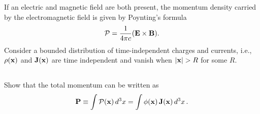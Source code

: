 \documentclass[11pt]{article}
\newcommand{\beq}{\begin{equation*}}
\newcommand{\eeq}{\end{equation*}}
\newenvironment{statement}[1]
{
	\section{#1}
	\color{darkgray}
	\ignorespaces
}
{
}
\newenvironment{problem}
{
	\subsection{}
	\color{darkgray}
    \ignorespaces
}
{

}
\begin{document}
\newcommand{\alp}{\alpha}
\newcommand{\tht}{\theta}
\newcommand{\vph}{\varphi}
\newcommand{\omg}{\omega}

\newcommand{\vA}{\vb{A}}
\newcommand{\vB}{\vb{B}}
\newcommand{\vE}{\vb{E}}
\newcommand{\vJ}{\vb{J}}
\newcommand{\vP}{\vb{P}}
\newcommand{\vv}{\vb{v}}
\newcommand{\vx}{\vb{x}}
\newcommand{\vomg}{\boldsymbol{\omg}}
\newcommand{\rh}{\vb{\hat{r}}}
\newcommand{\phh}{\boldsymbol{\hat{\vph}}}
\newcommand{\thh}{\boldsymbol{\hat{\tht}}}

\newcommand{\vAx}{\vA(\vx)}
\newcommand{\vBx}{\vB(\vx)}
\newcommand{\vJx}{\vJ(\vx)}
\newcommand{\vvx}{\vv(\vx)}

\newcommand{\rhox}{\rho(\vx)}
\newcommand{\absx}{\abs{\vx}}
\newcommand{\dcxp}{\dd[3]{\vx'}}

\newcommand{\xh}{\vb{\hat{x}}}
\newcommand{\yh}{\vb{\hat{y}}}
\newcommand{\zh}{\vb{\hat{z}}}
\newcommand{\omgh}{\boldsymbol{\hat{\omg}}}

\newcommand{\intotp}{\int_0^{2\pi}}
\newcommand{\intono}{\int_{-1}^1}
\newcommand{\intoi}{\int_0^\infty}
\newcommand{\drp}{\dd{r'}}
\newcommand{\dctp}{\dd{(\cos\tht')}}
\newcommand{\dvp}{\dd{\vph}}





\newcommand{\cP}{\mathcal{P}}
\newcommand{\vcP}{\vb{\cP}}
\newcommand{\vcPx}{\vcP(\vx)}
\newcommand{\dcx}{\dd[3]{x}}
\newcommand{\phix}{\phi(\vx)}

\newcommand{\vaa}{\vb{a}}
\newcommand{\vbb}{\vb{b}}
\newcommand{\vc}{\vb{c}}
\newcommand{\lap}{\laplacian}

\begin{statement}{}
	If an electric and magnetic field are both present, the momentum density carried by the electromagnetic field is given by Poynting's formula
	\beq
		\vcP = \frac{1}{4\pi c} (\vE \times \vB).
	\eeq
	Consider a bounded distribution of time-independent charges and currents, i.e., $\rhox$ and $\vJx$ are time independent and vanish when $\absx > R$ for some $R$.
\end{statement}

\begin{problem}
	Show that the total momentum can be written as
	\beq
		\vP \equiv \int \vcPx \dcx
		= \int \phix \, \vJx \dcx.
	\eeq
\end{problem}
\end{document}
